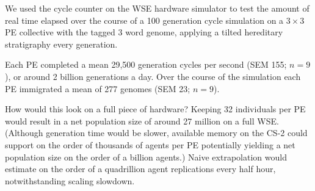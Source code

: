 We used the cycle counter on the WSE hardware simulator to test the amount of real time elapsed over the course of a 100 generation cycle simulation on a $3\times3$ PE collective with the tagged 3 word genome, applying a tilted hereditary stratigraphy every generation.

Each PE completed a mean 29,500 generation cycles per second (SEM 155; $n=9$), or around 2 billion generations a day.
Over the course of the simulation each PE immigrated a mean of 277 genomes (SEM 23; $n=9$).

How would this look on a full piece of hardware?
Keeping 32 individuals per PE would result in a net population size of around 27 million on a full WSE.
(Although generation time would be slower, available memory on the CS-2 could support on the order of thousands of agents per PE potentially yielding a net population size on the order of a billion agents.)
Naive extrapolation would estimate on the order of a quadrillion agent replications every half hour, notwithstanding scaling slowdown.

